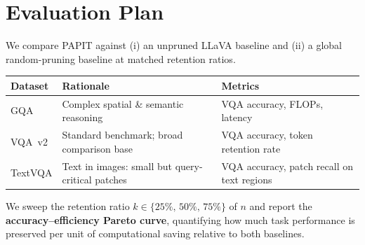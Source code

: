 \documentclass{article}
\begin{document}
\begin{center}
{\begin{tikzpicture}
\end{tikzpicture}}
\end{center}

\vspace{-0.2em}




\section*{Evaluation Plan}

We compare PAPIT against (i) an unpruned LLaVA baseline and
(ii) a global random-pruning baseline at matched retention ratios.

\vspace{0.4em}
\begin{tabularx}{\textwidth}{@{}llX@{}}
\toprule
\textbf{Dataset} & \textbf{Rationale} & \textbf{Metrics} \\
\midrule
GQA      & Complex spatial \& semantic reasoning
         & VQA accuracy, FLOPs, latency \\
VQA~v2   & Standard benchmark; broad comparison base
         & VQA accuracy, token retention rate \\
TextVQA  & Text in images: small but query-critical patches
         & VQA accuracy, patch recall on text regions \\
\bottomrule
\end{tabularx}
\vspace{0.3em}

We sweep the retention ratio $k \in \{25\%,\,50\%,\,75\%\}$ of $n$
and report the \textbf{accuracy–efficiency Pareto curve},
quantifying how much task performance is preserved per unit of
computational saving relative to both baselines.
\end{document}
